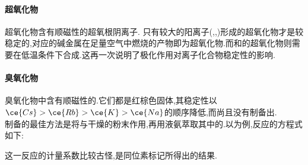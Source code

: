 \documentclass{ctexart}
\begin{document}
\paragraph{超氧化物}
超氧化物含有顺磁性的超氧根阴离子.%
只有较大的阳离子(,,)形成的超氧化物才是较稳定的,对应的碱金属在足量空气中燃烧的产物即为超氧化物.而和的超氧化物则需要在低温条件下合成.这再一次说明了极化作用对离子化合物稳定性的影响.
\paragraph{臭氧化物}
臭氧化物中含有顺磁性的.它们都是红棕色固体,其稳定性以$\ce{Cs}>\ce{Rb}>\ce{K}>\ce{Na}$的顺序降低,而尚且没有制备出.\\
\indent 制备的最佳方法是将与干燥的粉末作用,再用液氨萃取其中的.以为例,反应的方程式如下:
\begin{center}
\end{center}
这一反应的计量系数比较古怪,是同位素标记所得出的结果.
\end{document}
